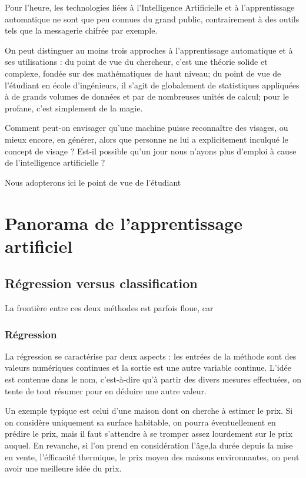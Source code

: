 Pour l'heure, les technologies liées à l'Intelligence Artificielle et à l'apprentissage automatique ne sont que peu connues du grand public, contrairement à des outils tels que la messagerie chifrée par exemple.

On peut distinguer au moins trois approches à l'apprentissage automatique et à ses utilisations : du point de vue du chercheur, c'est une théorie solide et complexe, fondée sur des mathématiques de haut niveau; du point de vue de l'étudiant en école d'ingénieurs, il s'agit de globalement de statistiques appliquées à de grands volumes de données et par de nombreuses unités de calcul; pour le profane, c'est simplement de la magie. 

Comment peut-on envisager qu'une machine puisse reconnaître des visages, ou mieux encore, en générer, alors que personne ne lui a explicitement inculqué le concept de visage ? Est-il possible qu'un jour nous n'ayons plus d'emploi à cause de l'intelligence artificielle ?

Nous adopterons ici le point de vue de l'étudiant

\chapter{Panorama de l'apprentissage artificiel}

\section{Régression versus classification}

La frontière entre ces deux méthodes est parfois floue, car 
\subsection{Régression}

La régression se caractérise par deux aspects : les entrées de la méthode sont des valeurs numériques continues et la sortie est une autre variable continue. L'idée est contenue dans le nom, c'est-à-dire qu'à partir des divers mesures effectuées, on tente de tout résumer pour en déduire une autre valeur.

Un exemple typique est celui d'une maison dont on cherche à estimer le prix. Si on considère uniquement sa surface habitable, on pourra éventuellement en prédire le prix, mais il faut s'attendre à se tromper assez lourdement sur le prix auquel. En revanche, si l'on prend en considération l'âge,la durée depuis la mise en vente, l'éfficacité thermique, le prix moyen des maisons environnantes, on peut avoir une meilleure idée du prix.

